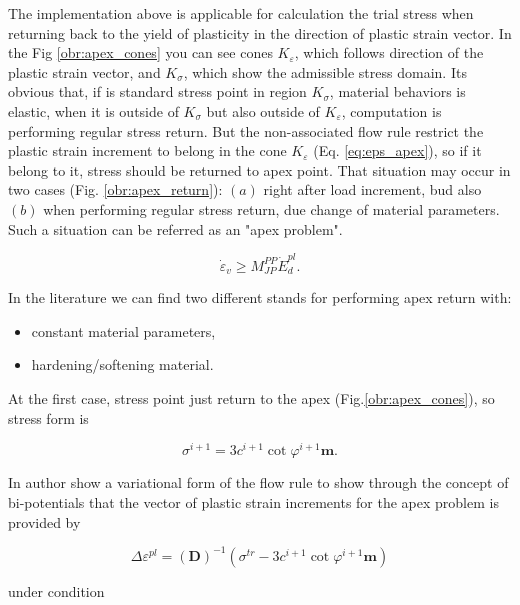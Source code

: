 The implementation above is applicable for calculation the trial stress when returning back to the yield of plasticity in the direction of plastic strain vector. In the Fig \ref{obr:apex_cones} you can see cones $K_\varepsilon$, which follows direction of the plastic strain vector, and $K_\sigma$, which show the admissible stress domain. Its obvious that, if is standard stress point in region $K_\sigma$, material behaviors is elastic, when it is outside of $K_\sigma$ but also outside of $K_\varepsilon$, computation is performing regular stress return. But the non-associated flow rule restrict the plastic strain increment to belong in the cone $K_\varepsilon$ (Eq. \ref{eq:eps_apex}), so if it belong to it, stress should be returned to apex point. That situation may occur in two cases (Fig. \ref{obr:apex_return}): $(a)$ right after load increment, bud also $(b)$ when performing regular stress return, due change of material parameters. Such a situation can be referred as an "apex problem". 

\begin{equation}\label{eq:eps_apex}
	\dot{\varepsilon}_v \geq M_{JP}^{PP} \dot{E}_d^{pl}.
\end{equation}

In the literature we can find two different stands for performing apex return with:

\begin{itemize}
	\item constant material parameters,
	\item hardening/softening material.
\end{itemize}
At the first case, stress point just return to the apex (Fig.\ref{obr:apex_cones}), so stress form is

\begin{equation}\label{eq:sigPL}
	\sigma^{i+1} = 3c^{i+1} \cot \varphi^{i+1} \textbf{m}.
\end{equation}

In \cite{geofem} author show a variational form of the flow rule to show through the concept of bi-potentials that the vector of plastic strain increments for the apex problem is provided by

\begin{equation}\label{eq:epsPL}
	\Delta\varepsilon^{pl} = (\textbf{D})^{-1}( \sigma^{tr} - 3 c^{i+1} \cot \varphi^{i+1} \textbf{m} )
\end{equation}

under condition



